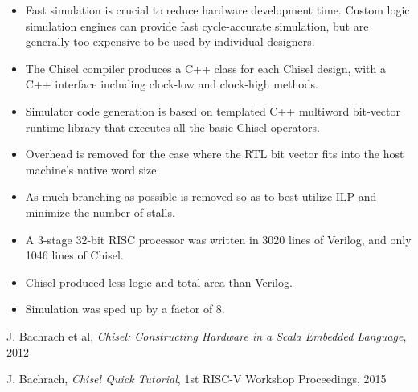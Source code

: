 \documentclass{beamer}
\begin{document}
\begin{frame}
\begin{itemize}

\item Fast simulation is crucial to reduce hardware development time. Custom logic simulation engines can provide fast cycle-accurate simulation, but are generally too expensive to be used by individual designers.

\item The Chisel compiler produces a C++ class for each Chisel design, with a C++ interface including clock-low and clock-high methods.

\item Simulator code generation is based on templated C++ multiword bit-vector runtime library that executes all the basic Chisel operators.

\item Overhead is removed for the case where the RTL bit vector fits into the host machine's native word size.

\item As much branching as possible is removed so as to best utilize ILP and minimize the number of stalls.

\end{itemize}
\end{frame}

\begin{frame}
\begin{itemize}

\item A 3-stage 32-bit RISC processor was written in 3020 lines of Verilog, and only 1046 lines of Chisel.

\item Chisel produced less logic and total area than Verilog.

\item Simulation was sped up by a factor of 8.

\end{itemize}
\end{frame}

\begin{thebibliography}{9}

	J. Bachrach et al,
	\emph{Chisel: Constructing Hardware in a Scala Embedded Language},
	2012

	J. Bachrach,
	\emph{Chisel Quick Tutorial},
	1st RISC-V Workshop Proceedings,
	2015

\end{thebibliography}
\end{document}
